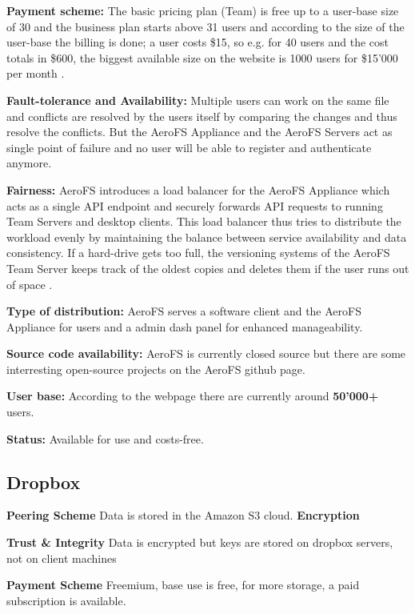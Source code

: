 \textbf{Payment scheme:} The basic pricing plan (Team) is free up to a user-base size of 30 \cite{aerofs:blog:30_users_free} and the business plan starts above 31 users and according to the size of the user-base the billing is done; a user costs \$15, so e.g. for 40 users and the cost totals in \$600, the biggest available size on the website is 1000 users for \$15'000 per month \cite{aerofs:pricing}.

\textbf{Fault-tolerance and Availability:} Multiple users can work on the same file and conflicts are resolved by the users itself by comparing the changes and thus resolve the conflicts. But the AeroFS Appliance and the AeroFS Servers act as single point of failure and no user will be able to register and authenticate anymore.

\textbf{Fairness:} AeroFS introduces a load balancer for the AeroFS Appliance which acts as a single API endpoint and securely forwards API requests to running Team Servers and desktop clients. This load balancer thus tries to distribute the workload evenly by maintaining the balance between service availability and data consistency.
If a hard-drive gets too full, the versioning systems of the AeroFS Team Server keeps track of the oldest copies and deletes them if the user runs out of space \cite{aerofs:USTO.RE}.

\textbf{Type of distribution:} AeroFS serves a software client and the AeroFS Appliance for users and a admin dash panel for enhanced manageability.

\textbf{Source code availability:} AeroFS is currently closed source but there are some interresting open-source projects on the AeroFS github page.

\textbf{User base:} According to the webpage \cite{aerofs} there are currently around \textbf{50'000+} users.

\textbf{Status:} Available for use and costs-free.

\subsection{Dropbox}

\textbf{Peering Scheme}
Data is stored in the Amazon S3 cloud.
\textbf{Encryption}

\textbf{Trust \& Integrity}
Data is encrypted but keys are stored on dropbox servers, not on client machines

\textbf{Payment Scheme}
Freemium, base use is free, for more storage, a paid subscription is available.


